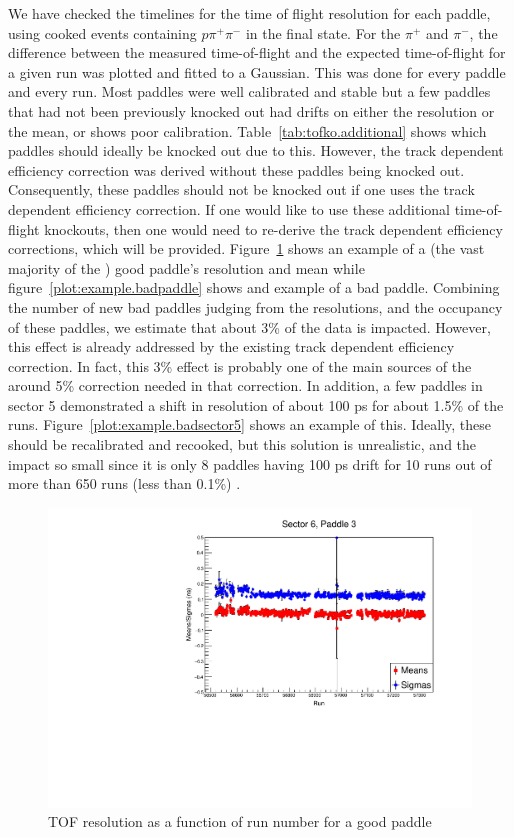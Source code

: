 \documentclass[ 12 pt]{article}
\begin{document}
\begin{itemize}
We have checked the timelines for the time of flight resolution for each paddle, using cooked events containing $p \pi^{+} \pi^{-}$ in the final state. For the $\pi^{+}$ and $\pi^{-}$, the difference between the measured time-of-flight and the expected time-of-flight for a given run was plotted and fitted to a Gaussian. This was done for every paddle and every run.  Most paddles were well calibrated and stable but a few paddles that had not been previously knocked out had drifts on either the resolution or the mean, or shows poor calibration. Table~\ref{tab:tofko.additional} shows which paddles should ideally be knocked out due to this. However, the track dependent efficiency correction was derived without these paddles being knocked out. Consequently, these paddles should not be knocked out if one uses the track dependent efficiency correction. If one would like to use these additional time-of-flight knockouts, then one would need to re-derive the track dependent efficiency corrections, which will be provided. Figure~\ref{plot:example.goodpaddle} shows an example of a (the vast majority of the ) good paddle's resolution and mean  while figure~\ref{plot:example.badpaddle} shows and example of a bad paddle. Combining the number of new bad paddles judging from the resolutions, and the occupancy of these paddles, we estimate that about 3\% of the data is impacted. However, this effect is already addressed by the existing track dependent efficiency correction. In fact, this 3\% effect is probably one of the main sources of the around 5\% correction needed in that correction.  In addition, a few paddles in sector 5 demonstrated a shift in resolution of about 100 ps for about 1.5\% of the runs. Figure~\ref{plot:example.badsector5} shows an example of this. Ideally, these should be recalibrated and recooked, but this solution is unrealistic, and the impact so small since it is only 8 paddles having 100 ps drift for 10 runs out of more than 650 runs (less than 0.1\%) . 




\begin{figure}\begin{center}
      \includegraphics[width=0.6\columnwidth]{figures/calib/tof/goodexample.pdf}
   \caption{\label{plot:example.goodpaddle}TOF resolution as a function of run number for a good paddle}
\end{center}\end{figure}


\end{itemize}
\end{document}
